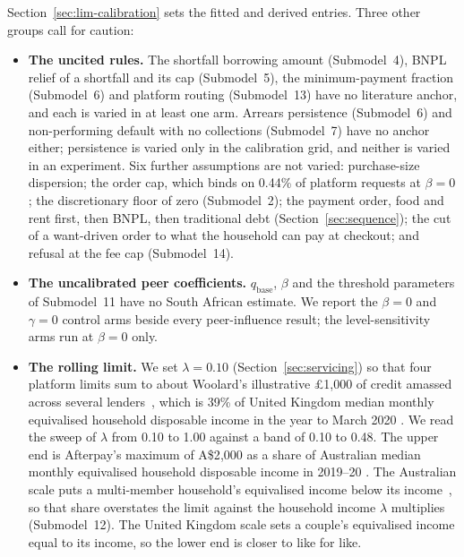 Section~\ref{sec:lim-calibration} sets the fitted and derived entries. Three other groups call
for caution:
\begin{itemize}
    \item \textbf{The uncited rules.} The shortfall borrowing amount (Submodel~4), \ac{BNPL} relief
    of a shortfall and its cap (Submodel~5), the minimum-payment fraction (Submodel~6) and platform
    routing (Submodel~13) have no literature anchor, and each is varied in at least one arm. Arrears
    persistence (Submodel~6) and non-performing default with no collections (Submodel~7) have no
    anchor either; persistence is varied only in the calibration grid, and neither is varied in an
    experiment. Six further assumptions are not varied: purchase-size dispersion; the order cap, which binds on 0.44\% of platform requests
    at $\beta=0$; the discretionary floor of zero (Submodel~2); the payment order, food and rent
    first, then \ac{BNPL}, then traditional debt (Section~\ref{sec:sequence}); the cut of a
    want-driven order to what the household can pay at checkout; and refusal at the fee cap
    (Submodel~14).
    \item \textbf{The uncalibrated peer coefficients.} $q_{\text{base}}$, $\beta$ and the
    threshold parameters of Submodel~11 have no South African estimate. We report the
    $\beta = 0$ and $\gamma = 0$ control arms beside every peer-influence result;
    the level-sensitivity arms run at $\beta = 0$ only.
    \item \textbf{The rolling limit.} We set $\lambda = 0.10$ (Section~\ref{sec:servicing}) so
    that four platform limits sum to about Woolard's illustrative
    \pounds1{,}000 of credit amassed across several lenders~\citep{woolard2021}, which is 39\% of United
    Kingdom median monthly equivalised household disposable income in the year to March 2020
    \citep{ons_income_fye2020}. We read the sweep of $\lambda$ from 0.10 to 1.00 against a
    band of 0.10 to 0.48. The upper end is Afterpay's maximum of A\$2{,}000 as a share of
    Australian median monthly equivalised household disposable income in 2019--20
    \citep{asic2020rep672,abs_income_2019_20}. The Australian scale puts a multi-member
    household's equivalised income below its income~\citep{abs_income_2019_20}, so that share overstates the limit against
    the household income $\lambda$ multiplies (Submodel~12). The United Kingdom scale sets a
    couple's equivalised income equal to its income, so the lower end is closer to like for like.
\end{itemize}


